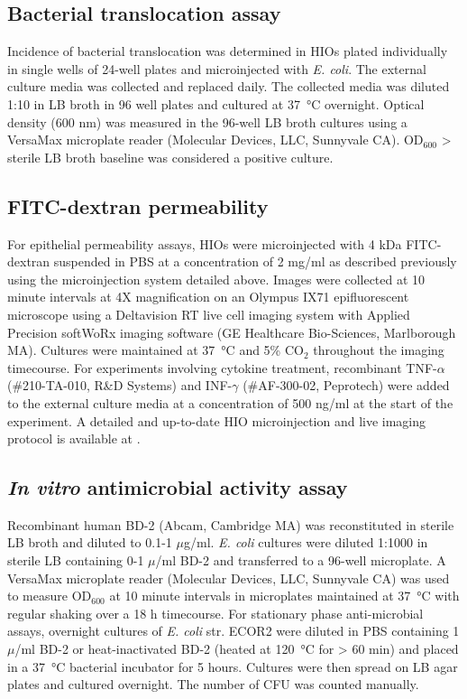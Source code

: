 \documentclass[9pt,lineo]{elife}
\begin{document}
\subsection*{{\bfseries\sffamily } Bacterial translocation assay}
\label{sec:orgheadline21}
Incidence of bacterial translocation was determined in HIOs plated individually in single wells of 24-well plates and microinjected with \emph{E. coli}. The external culture media was collected and replaced daily. The collected media was diluted 1:10 in LB broth in 96 well plates and cultured at \SI{37}{\celsius} overnight. Optical density (600 nm) was measured in the 96-well LB broth cultures using a VersaMax microplate reader (Molecular Devices, LLC, Sunnyvale CA). OD\(_{\text{600}}\) > sterile LB broth baseline was considered a positive culture. 
\subsection*{{\bfseries\sffamily } FITC-dextran permeability}
\label{sec:orgheadline22}
For epithelial permeability assays, HIOs were microinjected with 4 kDa FITC-dextran suspended in PBS at a concentration of 2 mg/ml as described previously \citep{Leslie:2015} using the microinjection system detailed above. Images were collected at 10 minute intervals at 4X magnification on an Olympus IX71 epifluorescent microscope using a Deltavision RT live cell imaging system with Applied Precision softWoRx imaging software (GE Healthcare Bio-Sciences, Marlborough MA). Cultures were maintained at \SI{37}{\celsius} and 5\% CO\(_{\text{2}}\) throughout the imaging timecourse. For experiments involving cytokine treatment, recombinant TNF-\(\alpha\) (\#210-TA-010, R\&D Systems) and INF-\(\gamma\) (\#AF-300-02, Peprotech) were added to the external culture media at a concentration of 500 ng/ml at the start of the experiment. A detailed and up-to-date HIO microinjection and live imaging protocol is available at \cite{Hill:gitb}.

\subsection*{{\bfseries\sffamily } \emph{In vitro} antimicrobial activity assay}
\label{sec:orgheadline23}
Recombinant human BD-2 (Abcam, Cambridge MA) was reconstituted in sterile LB broth and diluted to 0.1-1 \(\mu\)g/ml. \emph{E. coli} cultures were diluted 1:1000 in sterile LB containing 0-1 \(\mu\)/ml BD-2 and transferred to a 96-well microplate. A VersaMax microplate reader (Molecular Devices, LLC, Sunnyvale CA) was used to measure OD\(_{\text{600}}\) at 10 minute intervals in microplates maintained at \SI{37}{\celsius} with regular shaking over a 18 h timecourse. For stationary phase anti-microbial assays, overnight cultures of \emph{E. coli} str. ECOR2 were diluted in PBS containing 1 \(\mu\)/ml BD-2 or heat-inactivated BD-2 (heated at \SI{120}{\celsius} for > 60 min) and placed in a \SI{37}{\celsius} bacterial incubator for 5 hours. Cultures were then spread on LB agar plates and cultured overnight. The number of CFU was counted manually.
\end{document}
